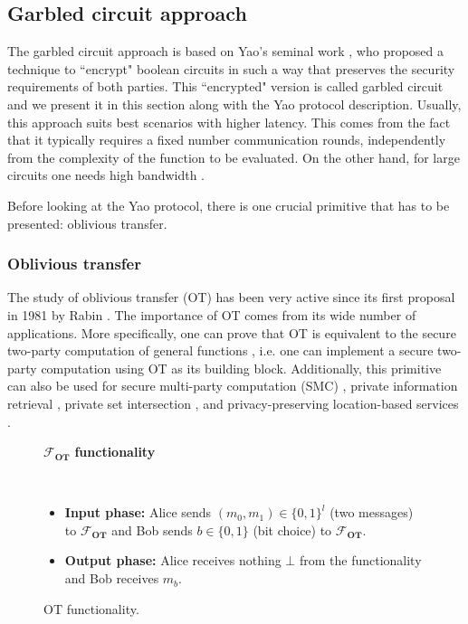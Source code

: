 \subsection{Garbled circuit approach}

The garbled circuit approach is based on Yao's seminal work \cite{Yao82}, who proposed a technique to ``encrypt" boolean circuits in such a way that preserves the security requirements of both parties. This ``encrypted" version is called garbled circuit and we present it in this section along with the Yao protocol description. Usually, this approach suits best scenarios with higher latency. This comes from the fact that it typically requires a fixed number communication rounds, independently from the complexity of the function to be evaluated. On the other hand, for large circuits one needs high bandwidth \cite{PWM+20}.

Before looking at the Yao protocol, there is one crucial primitive that has to be presented: oblivious transfer.

\subsubsection{Oblivious transfer}

The study of oblivious transfer (OT) has been very active since its first proposal in 1981 by Rabin \cite{Rabin81}. The importance of OT comes from its wide number of applications. More specifically, one can prove that OT is equivalent to the secure two-party computation of general functions \cite{Y86, K88}, i.e. one can implement a secure two-party computation using OT as its building block. Additionally, this primitive can also be used for secure multi-party computation (SMC) \cite{KOS16}, private information retrieval \cite{Che04}, private set intersection \cite{MEP17}, and privacy-preserving location-based services \cite{BHM+19}.

\begin{figure}[h!]
\centering
\begin{tcolorbox}
                        
    \centerline{$\mathcal{F}_{\textbf{OT}}$ \textbf{functionality}}
            
    \
    
    \begin{itemize}
    		\item \textbf{Input phase:} Alice sends $(m_0, m_1)\in\{0,1\}^l$ (two messages) to $\mathcal{F}_{\textbf{OT}}$ and Bob sends $b\in\{0,1\}$ (bit choice) to $\mathcal{F}_{\textbf{OT}}$.
    		\item \textbf{Output phase:} Alice receives nothing $\bot$ from the functionality and Bob receives $m_b$.
    \end{itemize}
    
\end{tcolorbox} 
    \caption{OT functionality.}
    \label{fig:OT_functionality}
\end{figure}

